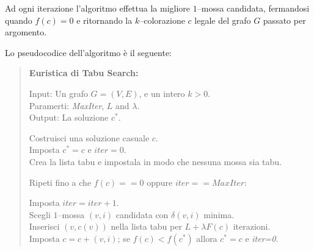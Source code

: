 \documentclass[a4paper,10pt]{article}
\begin{document}
Ad ogni iterazione l'algoritmo effettua la migliore $1$--mossa candidata, fermandosi quando $f(c)=0$ e ritornando la $k$--colorazione $c$ legale del grafo $G$ passato per argomento.

Lo pseudocodice dell'algoritmo è il seguente:

\begin{quote}
\textbf{Euristica di Tabu Search:}

Input: Un grafo $G=(V,E)$, e un intero $k>0$. \\
Paramerti: \emph{MaxIter}, $L$ and $\lambda$. \\
Output: La soluzione $c^{*}$.

Costruisci una soluzione casuale $c$. \\
Imposta $c^{*}=c$ e $iter=0$. \\
Crea la lista tabu e impostala in modo che nessuna mossa sia tabu.

Ripeti fino a che $f(c)==0$ oppure $iter==MaxIter$:

\hspace*{8pt}Imposta $iter=iter+1$. \\
\hspace*{8pt}Scegli $1$--mossa $(v,i)$ candidata con $\delta(v,i)$ minima. \\
\hspace*{8pt}Inserisci $(v,c(v))$ nella lista tabu per $L+\lambda F(c)$ iterazioni. \\
\hspace*{8pt}Imposta $c=c+(v,i)$; se $f(c)<f(c^{*})$ allora $c^{*}=c$ e \emph{iter=0}.

\end{quote}
\end{document}
